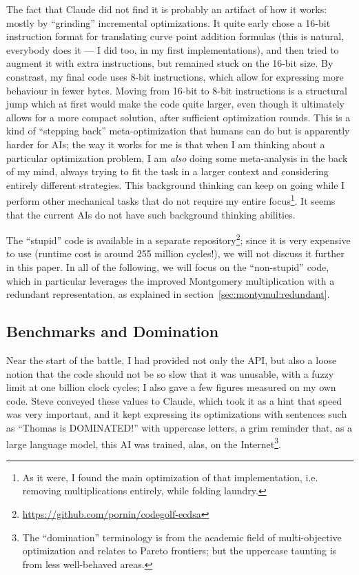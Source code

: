 \documentclass{llncs}
\begin{document}
The fact that Claude did not find it is probably an artifact of how it
works: mostly by ``grinding'' incremental optimizations. It quite early
chose a 16-bit instruction format for translating curve point addition
formulas (this is natural, everybody does it --- I did too, in my first
implementations), and then tried to augment it with extra instructions,
but remained stuck on the 16-bit size. By constrast, my final code uses
8-bit instructions, which allow for expressing more behaviour in fewer
bytes. Moving from 16-bit to 8-bit instructions is a structural jump
which at first would make the code quite larger, even though it
ultimately allows for a more compact solution, after sufficient
optimization rounds. This is a kind of ``stepping back''
meta-optimization that humans can do but is apparently harder for AIs;
the way it works for me is that when I am thinking about a particular
optimization problem, I am \emph{also} doing some meta-analysis in the
back of my mind, always trying to fit the task in a larger context and
considering entirely different strategies. This background thinking can
keep on going while I perform other mechanical tasks that do not require
my entire focus\footnote{As it were, I found the main optimization of
that implementation, i.e. removing multiplications entirely, while
folding laundry.}. It seems that the current AIs do not have such
background thinking abilities.

The ``stupid'' code is available in a separate
repository\footnote{\url{https://github.com/pornin/codegolf-ecdsa}};
since it is very expensive to use (runtime cost is around 255 million
cycles!), we will not discuss it further in this paper. In all of the
following, we will focus on the ``non-stupid'' code, which in particular
leverages the improved Montgomery multiplication with a redundant
representation, as explained in section~\ref{sec:montymul:redundant}.

\subsection{Benchmarks and Domination}

Near the start of the battle, I had provided not only the API, but also
a loose notion that the code should not be so slow that it was unusable,
with a fuzzy limit at one billion clock cycles; I also gave a few
figures measured on my own code. Steve conveyed these values to Claude,
which took it as a hint that speed was very important, and it kept
expressing its optimizations with sentences such as ``Thomas is
DOMINATED!'' with uppercase letters, a grim reminder that, as a large
language model, this AI was trained, alas, on the Internet\footnote{The
``domination'' terminology is from the academic field of multi-objective
optimization and relates to Pareto frontiers; but the uppercase taunting
is from less well-behaved areas.}.
\end{document}
